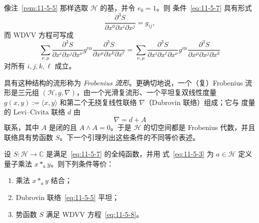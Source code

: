 \begin{remark}\label{rem:11-5-6}
像注~\ref{rem:11-5-5} 那样选取 $\mathcal H$ 的基，并令 $e_0=1$。则
条件~\eqref{eq:11-5-7} 具有形式
\begin{equation}\label{eq:11-5-9}
  \frac{\partial^3S}{\partial x^0\partial x^i\partial x^j}=g_{ij},
\end{equation}
而 WDVV 方程可写成
\[
  \sum_{\nu,\mu}
  \frac{\partial^3S}{\partial x^i\partial x^j\partial x^\nu}
  g^{\nu\mu}
  \frac{\partial^3S}{\partial x^\mu\partial x^k\partial x^\ell}
  =
  \sum_{\nu,\mu}
  \frac{\partial^3S}{\partial x^i\partial x^\ell\partial x^\nu}
  g^{\nu\mu}
  \frac{\partial^3S}{\partial x^\mu\partial x^j\partial x^k}
\]
对所有 $i,j,k,\ell$ 成立。
\end{remark}

具有这种结构的流形称为 \emph{Frobenius 流形}。更确切地说，一个（复）Frobenius
流形是三元组 $(\mathcal H,g,\nabla)$，由一个光滑复流形、一个平坦复双线性度量
$g(x,y):=\langle x,y\rangle$ 和第二个无挠复线性联络 $\nabla$（Dubrovin 联络）组成；它与
度量的 Levi--Civita 联络 $d$ 由
\[
  \nabla=d+A
\]
联系，其中 $A$ 是闭的且 $A\wedge A=0$。于是 $\mathcal H$ 的切空间都是 Frobenius
代数，并且联络具有势函数 $S$。下一个引理列出这些条件的不同等价表述。

\begin{lemma}\label{lem:11-5-7}
设 $S:\mathcal H\to\mathbb C$ 是满足~\eqref{eq:11-5-7} 的全纯函数，并用
式~\eqref{eq:11-5-3} 为 $a\in\mathcal H$ 定义量子乘法 $x*_a y$。则下列条件等价：
\begin{enumerate}[label=(\roman*)]
\item 乘法 $x*_a y$ 结合；
\item {}Dubrovin 联络~\eqref{eq:11-5-5} 平坦；
\item {}势函数 $S$ 满足 WDVV 方程~\eqref{eq:11-5-8}。
\end{enumerate}
\end{lemma}

